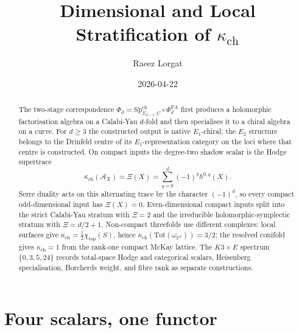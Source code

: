 \documentclass[11pt]{article}
\title{Dimensional and Local Stratification of $\kappa_{\mathrm{ch}}$}
\author{Raeez Lorgat}
\date{2026-04-22}
\providecommand{\cA}{\mathcal{A}}
\begin{document}
\maketitle

\begin{abstract}
The two-stage correspondence
$\Phi_d=\mathrm{Sp}^{\mathrm{ch}}_{\Sigma_{d-1},C}\circ\Phi^{\mathrm{FA}}_d$
first produces a holomorphic factorisation algebra on a Calabi-Yau
$d$-fold and then specialises it to a chiral algebra on a curve. For
$d\ge 3$ the constructed output is native \(E_1\)-chiral; the \(E_2\)
structure belongs to the Drinfeld centre of its \(E_1\)-representation
category on the loci where that centre is constructed. On compact
inputs the degree-two shadow scalar is the Hodge supertrace
\[
  \kappa_{\mathrm{ch}}(\cA_X)=
  \Xi(X)=\sum_{q=0}^{d}(-1)^q h^{0,q}(X).
\]
Serre duality acts on this alternating trace by the character
\((-1)^d\), so every compact odd-dimensional input has
\(\Xi(X)=0\). Even-dimensional compact inputs split into the strict
Calabi-Yau stratum with \(\Xi=2\) and the irreducible
holomorphic-symplectic stratum with \(\Xi=d/2+1\). Non-compact
threefolds use different complexes: local surfaces give
\(\kappa_{\mathrm{ch}}=\frac12\chi_{\mathrm{top}}(S)\), hence
\(\kappa_{\mathrm{ch}}(\mathrm{Tot}(\omega_{\mathbb P^2}))=3/2\);
the resolved conifold gives \(\kappa_{\mathrm{ch}}=1\) from the
rank-one compact McKay lattice. The \(K3\times E\) spectrum
\(\{0,3,5,24\}\) records total-space Hodge and categorical scalars,
Heisenberg specialisation, Borcherds weight, and fibre rank as separate
constructions.
\end{abstract}

\section{Four scalars, one functor}
\label{sec:four-scalars}
\end{document}
